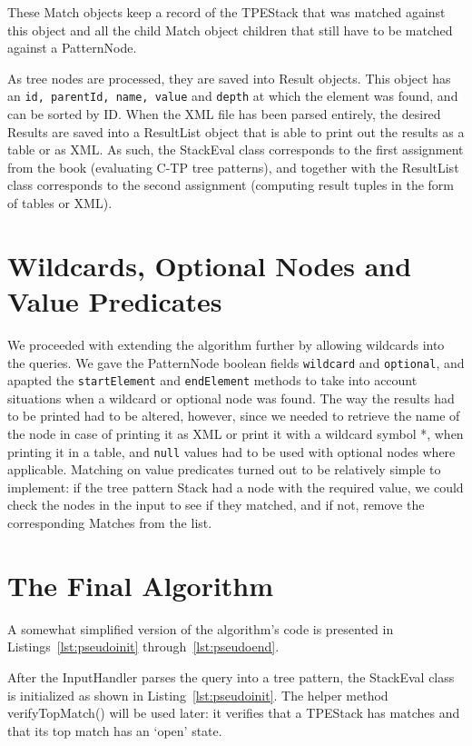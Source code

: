 \documentclass[11pt]{article}
\begin{document}
These Match objects keep a record of the TPEStack that was matched against this object and all the child Match object children that still have to be matched against a PatternNode. 

As tree nodes are processed, they are saved into Result objects. This object has an \lstinline{id, parentId, name, value} and \lstinline{depth} at which the element was found, and can be sorted by ID. When the XML file has been parsed entirely, the desired Results are saved into a ResultList object that is able to print out the results as a table or as XML. As such, the StackEval class corresponds to the first assignment from the book (evaluating C-TP tree patterns), and together with the ResultList class corresponds to the second assignment (computing result tuples in the form of tables or XML).

\newpage
\section{Wildcards, Optional Nodes and Value Predicates}
We proceeded with extending the algorithm further by allowing wildcards into the queries. We gave the PatternNode boolean fields \lstinline{wildcard} and \lstinline{optional}, and apapted the \lstinline{startElement} and \lstinline{endElement} methods to take into account situations when a wildcard or optional node was found. The way the results had to be printed had to be altered, however, since we needed to retrieve the name of the node in case of printing it as XML or print it with a wildcard symbol *, when printing it in a table, and \lstinline{null} values had to be used with optional nodes where applicable.
Matching on value predicates turned out to be relatively simple to implement: if the tree pattern Stack had a node with the required value, we could check the nodes  in the input to see if they matched, and if not, remove the corresponding Matches from the list.

\section{The Final Algorithm}
A somewhat simplified version of the algorithm's code is presented in Listings~\ref{lst:pseudoinit} through~\ref{lst:pseudoend}. 


After the InputHandler parses the query into a tree pattern, the StackEval class is initialized as shown in Listing~\ref{lst:pseudoinit}. The helper method verifyTopMatch() will be used later: it verifies that a TPEStack has matches and that its top match has an `open' state.\\
\end{document}
